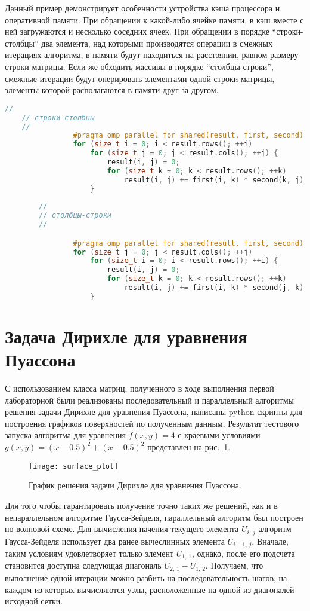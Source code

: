 \documentclass[13pt]{article}
\begin{document}
	Данный пример демонстрирует особенности устройства кэша процессора и оперативной памяти. При обращении к какой-либо ячейке памяти, в кэш вместе с ней загружаются и несколько соседних ячеек. При обращении в порядке ``строки-столбцы'' два элемента, над которыми производятся операции в смежных итерациях алгоритма, в памяти будут находиться на расстоянии, равном размеру строки матрицы. Если же обходить массивы в порядке ``столбцы-строки'', смежные итерации будут оперировать элементами одной строки матрицы, элементы которой располагаются в памяти друг за другом.
	
	\begin{lstlisting}[language=C++, caption={Два способа обхода матрицы}, label={lst:matrixLookup}, texcl=true]
	//
	// строки-столбцы
	//
				#pragma omp parallel for shared(result, first, second)
				for (size_t i = 0; i < result.rows(); ++i) 
					for (size_t j = 0; j < result.cols(); ++j) {
						result(i, j) = 0;
						for (size_t k = 0; k < result.rows(); ++k) 
							result(i, j) += first(i, k) * second(k, j);
					}
					
		//
		// столбцы-строки
		//

				#pragma omp parallel for shared(result, first, second)
				for (size_t j = 0; j < result.cols(); ++j) 
					for (size_t i = 0; i < result.rows(); ++i) {
						result(i, j) = 0;
						for (size_t k = 0; k < result.rows(); ++k) 
							result(i, j) += first(i, k) * second(j, k);
					}

	\end{lstlisting}
	\section{Задача Дирихле для уравнения Пуассона}\label{sec:lab2}

	С использованием класса матриц, полученного в ходе выполнения первой лабораторной были реализованы последовательный и параллельный алгоритмы решения задачи Дирихле для уравнения Пуассона, написаны python-скрипты для построения графиков поверхностей по полученным данным.
	Результат тестового запуска алгоритма для уравнения $f(x,y) = 4$ с краевыми условиями $g(x,y) =(x - 0.5)^2 + (x - 0.5)^2$ представлен на рис.~\ref{fig:surfPlot}.
	\begin{figure}[h]
		\centering		\texttt{[image: surface\_plot]}
		\caption{График решения задачи Дирихле для уравнения Пуассона.}
		\label{fig:surfPlot} 
	\end{figure}

	Для того чтобы гарантировать получение точно таких же решений, как и в непараллельном алгоритме Гаусса-Зейделя, параллельный алгоритм был построен по волновой схеме. Для вычисления начения текущего элемента $U_{i,\,j}$ алгоритм Гаусса-Зейделя использует два ранее вычеслинных элемента $U_{i-1,\,j}$, Вначале, таким условиям удовлетворяет только элемент $U_{1,\,1}$, однако, после его подсчета становится доступна следующая диагональ $U_{2,\,1} - U_{1,\,2}$. Получаем,	что выполнение одной итерации можно разбить на последовательность шагов, на каждом из которых вычисляются узлы, расположенные на одной из диагоналей исходной сетки. 
	
\end{document}
